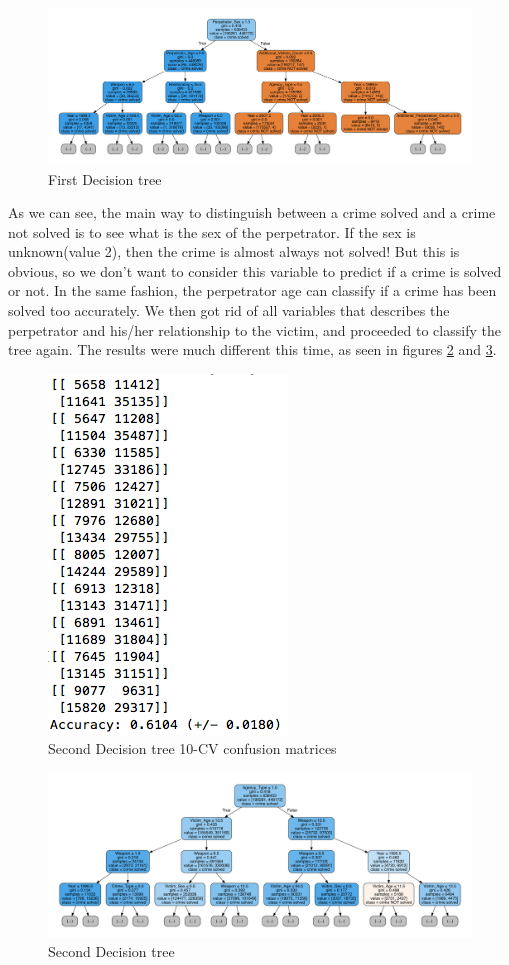 \documentclass[12pt]{report}
\begin{document}
\begin{figure}[h]
  \centering
  \includegraphics[width=\linewidth]{../Images/PerfectDecisionTree}
  \caption{First Decision tree}
  \label{fig:PDT}
\end{figure}

As we can see, the main way to distinguish between a crime solved and a crime not solved is to see what is the sex of the perpetrator. If the sex is unknown(value 2), then the crime is almost always not solved! But this is obvious, so we don't want to consider this variable to predict if a crime is solved or not. In the same fashion, the perpetrator age can classify if a crime has been solved too accurately.
We then got rid of all variables that describes the perpetrator and his/her relationship to the victim, and proceeded to classify the tree again. The results were much different this time, as seen in figures \ref{fig:RDTCM} and \ref{fig:RDT}.

\begin{figure}[h]
  \centering
  \includegraphics[width=0.25\linewidth]{../Images/RealDecisionTreeCM}
  \caption{Second Decision tree 10-CV confusion matrices}
  \label{fig:RDTCM}
\end{figure}

\begin{figure}[h]
  \centering
  \includegraphics[width=\linewidth]{../Images/RealDecisionTree}
  \caption{Second Decision tree}
  \label{fig:RDT}
\end{figure}
\end{document}
